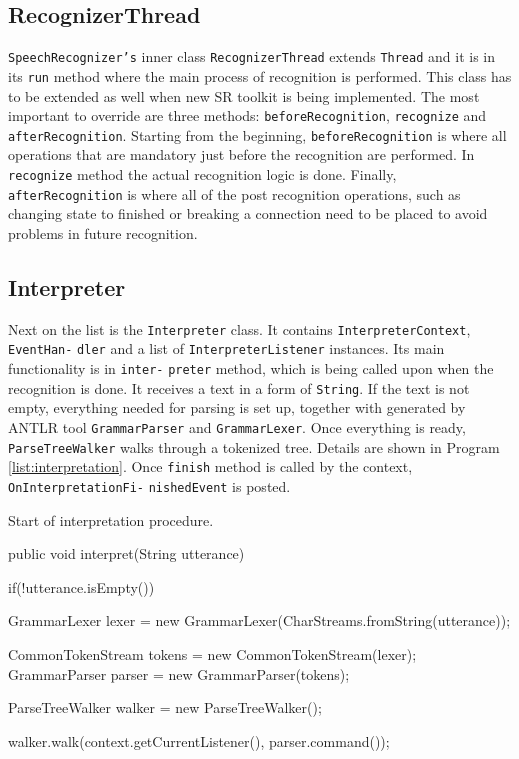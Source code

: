 \subsection{RecognizerThread}
\texttt{SpeechRecognizer's} inner class \texttt{RecognizerThread} extends \texttt{Thread} and it is in its \texttt{run} method where the main process of recognition is performed. This class has to be extended as well when new SR toolkit is being implemented. The most important to override are three methods: \texttt{beforeRecognition}, \texttt{recognize} and \texttt{afterRecognition}. Starting from the beginning, \texttt{beforeRecognition} is where all operations that are mandatory just before the recognition are performed. In \texttt{recognize} method the actual recognition logic is done. Finally, \texttt{afterRecognition} is where all of the post recognition operations, such as changing state to finished or breaking a connection need to be placed to avoid problems in future recognition.

\subsection{Interpreter}
Next on the list is the \texttt{Interpreter} class. It contains \texttt{InterpreterContext}, \texttt{EventHan-} \texttt{dler} and a list of \texttt{InterpreterListener} instances. Its main functionality is in \texttt{inter-} \texttt{preter} method, which is being called upon when the recognition is done. It receives a text in a form of \texttt{String}. If the text is not empty, everything needed for parsing is set up, together with generated by ANTLR tool \texttt{GrammarParser} and \texttt{GrammarLexer}. Once everything is ready, \texttt{ParseTreeWalker} walks through a tokenized tree. Details are shown in Program \ref{list:interpretation}. Once \texttt{finish} method is called by the context, \texttt{OnInterpretationFi-} \texttt{nishedEvent} is posted.

\begin{program}[hbt!]
    \caption{Start of interpretation procedure.}
    \label{list:interpretation}
    \begin{JavaCode}
public void interpret(String utterance) {
	if(!utterance.isEmpty()) {			
		GrammarLexer lexer = new GrammarLexer(CharStreams.fromString(utterance));

		CommonTokenStream tokens = new CommonTokenStream(lexer);
		GrammarParser parser = new GrammarParser(tokens);

		ParseTreeWalker walker = new ParseTreeWalker();
		
		walker.walk(context.getCurrentListener(), parser.command());	
	}
}    \end{JavaCode}
\end{program}

